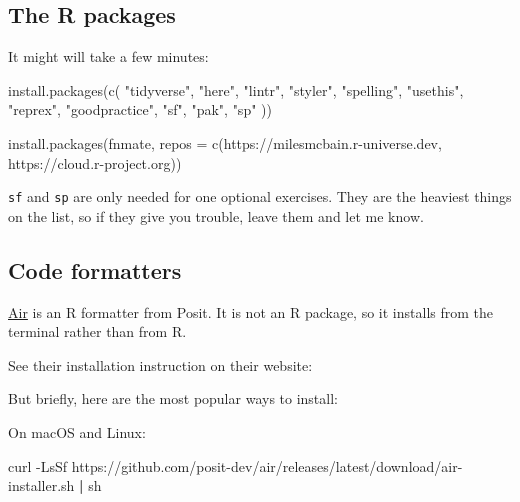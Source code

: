 \documentclass[
  letterpaper,
  justified,
  a4paper]{tufte-book}
\makeatletter
\newenvironment{Shaded}{\begin{snugshade}}{\end{snugshade}}
\newcommand{\AttributeTok}[1]{\textcolor[rgb]{0.40,0.45,0.13}{#1}}
\newcommand{\ExtensionTok}[1]{\textcolor[rgb]{0.00,0.23,0.31}{#1}}
\newcommand{\FunctionTok}[1]{\textcolor[rgb]{0.28,0.35,0.67}{#1}}
\newcommand{\KeywordTok}[1]{\textcolor[rgb]{0.00,0.23,0.31}{\textbf{#1}}}
\newcommand{\NormalTok}[1]{\textcolor[rgb]{0.00,0.23,0.31}{#1}}
\newcommand{\StringTok}[1]{\textcolor[rgb]{0.13,0.47,0.30}{#1}}
\let\rbporigShaded\Shaded
\let\rbporigendShaded\endShaded
\renewenvironment{Shaded}{%
  \begingroup
  \ifdim\linewidth=\rbpbodywidth
    \advance\linewidth by \@tufte@overhang
    \advance\hsize by \@tufte@overhang
    \advance\columnwidth by \@tufte@overhang
  \fi
  \rbporigShaded
}{%
  \rbporigendShaded
  \endgroup
}
\makeatother
\begin{document}
\subsection*{The R packages}\label{the-r-packages}

It might will take a few minutes:

\begin{Shaded}
\begin{Highlighting}[]
\FunctionTok{install.packages}\NormalTok{(}\FunctionTok{c}\NormalTok{(}
  \StringTok{"tidyverse"}\NormalTok{,}
  \StringTok{"here"}\NormalTok{,}
  \StringTok{"lintr"}\NormalTok{,}
  \StringTok{"styler"}\NormalTok{,}
  \StringTok{"spelling"}\NormalTok{,}
  \StringTok{"usethis"}\NormalTok{,}
  \StringTok{"reprex"}\NormalTok{,}
  \StringTok{"goodpractice"}\NormalTok{,}
  \StringTok{"sf"}\NormalTok{,}
  \StringTok{"pak"}\NormalTok{,}
  \StringTok{"sp"}
\NormalTok{))}

\FunctionTok{install.packages}\NormalTok{(}\StringTok{\textquotesingle{}fnmate\textquotesingle{}}\NormalTok{, }\AttributeTok{repos =} \FunctionTok{c}\NormalTok{(}\StringTok{\textquotesingle{}https://milesmcbain.r{-}universe.dev\textquotesingle{}}\NormalTok{, }\StringTok{\textquotesingle{}https://cloud.r{-}project.org\textquotesingle{}}\NormalTok{))}
\end{Highlighting}
\end{Shaded}

\texttt{sf} and \texttt{sp} are only needed for one optional exercises.
They are the heaviest things on the list, so if they give you trouble,
leave them and let me know.

\subsection*{Code formatters}\label{code-formatters}

\href{https://posit-dev.github.io/air/}{Air} is an R formatter from
Posit. It is not an R package, so it installs from the terminal rather
than from R.

See their installation instruction on their website:

But briefly, here are the most popular ways to install:

On macOS and Linux:

\begin{Shaded}
\begin{Highlighting}[]
\ExtensionTok{curl} \AttributeTok{{-}LsSf}\NormalTok{ https://github.com/posit{-}dev/air/releases/latest/download/air{-}installer.sh }\KeywordTok{|} \FunctionTok{sh}
\end{Highlighting}
\end{Shaded}
\end{document}
